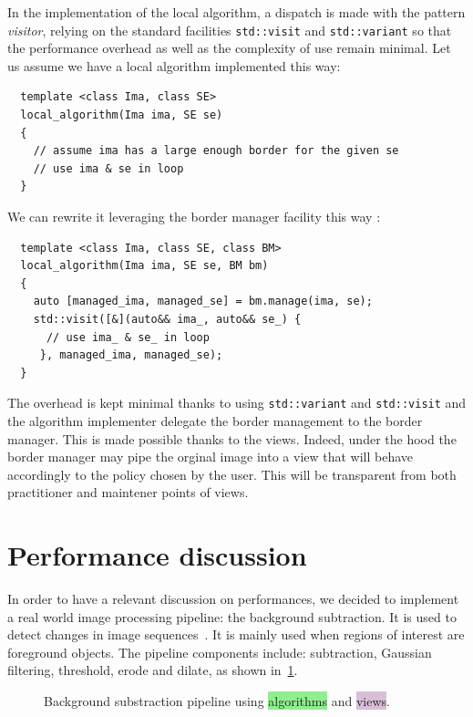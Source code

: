 In the implementation of the local algorithm, a dispatch is made with the pattern \emph{visitor}, relying on the
standard facilities \texttt{std::visit} and \texttt{std::variant} so that the performance overhead as well as the
complexity of use remain minimal. Let us assume we have a local algorithm implemented this way:
\begin{verbatim}
  template <class Ima, class SE>
  local_algorithm(Ima ima, SE se)
  {
    // assume ima has a large enough border for the given se
    // use ima & se in loop
  }
\end{verbatim}
We can rewrite it leveraging the border manager facility this way :
\begin{verbatim}
  template <class Ima, class SE, class BM>
  local_algorithm(Ima ima, SE se, BM bm)
  {
    auto [managed_ima, managed_se] = bm.manage(ima, se);
    std::visit([&](auto&& ima_, auto&& se_) { 
      // use ima_ & se_ in loop
     }, managed_ima, managed_se);
  }
\end{verbatim}
The overhead is kept minimal thanks to using \texttt{std::variant} and \texttt{std::visit} and the algorithm implementer
delegate the border management to the border manager. This is made possible thanks to the views. Indeed, under the hood
the border manager may pipe the orginal image into a view that will behave accordingly to the policy chosen by the user.
This will be transparent from both practitioner and maintener points of views.


\section{Performance discussion}

In order to have a relevant discussion on performances, we decided to implement a real world image processing pipeline:
the background subtraction. It is used to detect changes in image sequences~\cite{opencv.bg_sub}. It is mainly used when
regions of interest are foreground objects. The pipeline components include: subtraction, Gaussian filtering, threshold,
erode and dilate, as shown in~\cref{fig.view.comp.sub_bg}.

\begin{figure}[tbh]
  \begin{minipage}{\linewidth}
    
  \end{minipage}
  \caption{Background substraction pipeline using \colorbox{lightgreen}{algorithms} and
    \colorbox{thistle}{views}.}
  \label{fig.view.comp.sub_bg}
\end{figure}

